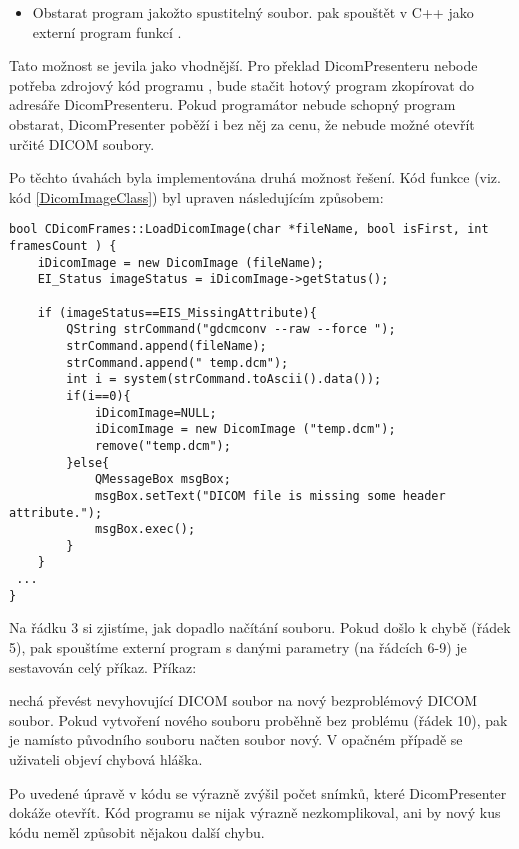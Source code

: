 \begin{itemize}
\item
Obstarat program  jakožto spustitelný soubor.  pak spouštět v C++ jako externí program funkcí .
\end{itemize}

Tato možnost se jevila jako vhodnější. Pro překlad DicomPresenteru nebode potřeba zdrojový kód programu , bude stačit hotový program zkopírovat do adresáře DicomPresenteru. Pokud programátor nebude schopný program obstarat, DicomPresenter poběží i bez něj za cenu, že nebude možné otevřít určité DICOM soubory.

Po těchto úvahách byla implementována druhá možnost řešení. Kód funkce  (viz. kód \ref{DicomImageClass}) byl upraven následujícím způsobem:

\begin{lstlisting}[label={xxx}]
bool CDicomFrames::LoadDicomImage(char *fileName, bool isFirst, int framesCount ) {
	iDicomImage = new DicomImage (fileName);
	EI_Status imageStatus = iDicomImage->getStatus();

	if (imageStatus==EIS_MissingAttribute){			
		QString strCommand("gdcmconv --raw --force ");
		strCommand.append(fileName);
		strCommand.append(" temp.dcm");
		int i = system(strCommand.toAscii().data());
		if(i==0){
			iDicomImage=NULL;
			iDicomImage = new DicomImage ("temp.dcm");
			remove("temp.dcm");
		}else{
			QMessageBox msgBox;
			msgBox.setText("DICOM file is missing some header attribute.");
			msgBox.exec();
		}		
	}
 ...
}
\end{lstlisting}

Na řádku 3 si zjistíme, jak dopadlo načítání souboru. Pokud došlo k chybě (řádek 5), pak spouštíme externí program  s danými parametry (na řádcích 6-9) je sestavován celý příkaz. Příkaz:


nechá převést nevyhovující DICOM soubor na nový bezproblémový DICOM soubor. Pokud vytvoření nového souboru proběhně bez problému (řádek 10), pak je namísto původního souboru načten soubor nový. V opačném případě se uživateli objeví chybová hláška.

Po uvedené úpravě v kódu se výrazně zvýšil počet snímků, které DicomPresenter dokáže otevřít. Kód programu se nijak výrazně nezkomplikoval, ani by nový kus kódu neměl způsobit nějakou další chybu.



